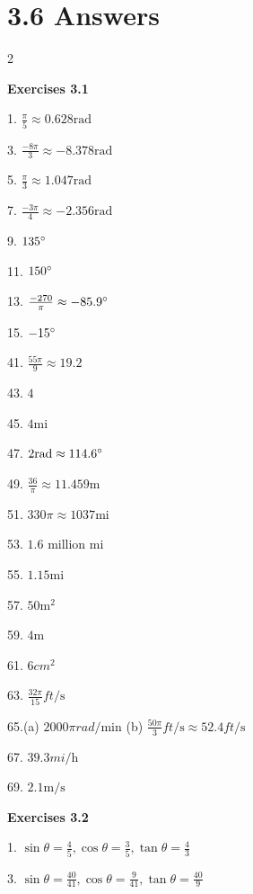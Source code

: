 \section{3.6 Answers}
\columnsep =30pt
\begin {multicols}{2}
 

\textbf{Exercises 3.1} 

1. $\frac{\pi }{5} \approx 0.628 \mbox{rad}$ 

3. $\frac{ -8 \pi }{3} \approx  -8.378 \mbox{rad}$ 

5. $\frac{\pi }{3} \approx 1.047 \mbox{rad}$ 

7. $\frac{ -3 \pi }{4} \approx  -2.356 \mbox{rad}$ 

9. $135 \mbox{{\ensuremath{{}^\circ}}}$ 

11. $150 \mbox{{\ensuremath{{}^\circ}}}$ 

13. $\frac{ -270}{\pi } \approx  -85.9 \mbox{{\ensuremath{{}^\circ}}}$ 

15. $ -15 \mbox{{\ensuremath{{}^\circ}}}$ 

41. $\frac{55 \pi }{9} \approx 19.2$ 

43. $4$ 

45. $4 \mbox{mi}$ 

47. $2 \mbox{rad} \approx 114.6 \mbox{{\ensuremath{{}^\circ}}}$ 

49. $\frac{36}{\pi } \approx 11.459 \mbox{m}$ 

51. $330 \pi  \approx 1037 \mbox{mi}$ 

53. $1.6$ million $\mbox{mi}$ 

55. $1.15 \mbox{mi}$ 

57. $50 \mathrm{m}^{2}$ 

59. $4 \mbox{m}$ 

61. $6 cm^{2}$ 

63. $\frac{32 \pi }{15} ft/\mbox{s}$ 

65.(a) $2000 \pi  rad/\mbox{min}$ (b) $\frac{50 \pi }{3} ft/\mbox{s} \approx 52.4 ft/\mbox{s}$ 

67. $39.3 mi/\mbox{h}$ 

69. $2.1 \mathrm{m}/\mbox{s}$ 

\textbf{Exercises 3.2} 

1. $\sin  \theta  =\frac{4}{5} ,\cos  \theta  =\frac{3}{5} ,\tan  \theta  =\frac{4}{3}$ 

3. $\sin  \theta  =\frac{40}{41} ,\cos  \theta  =\frac{9}{41} ,\tan  \theta  =\frac{40}{9}$ 


\end{multicols}
